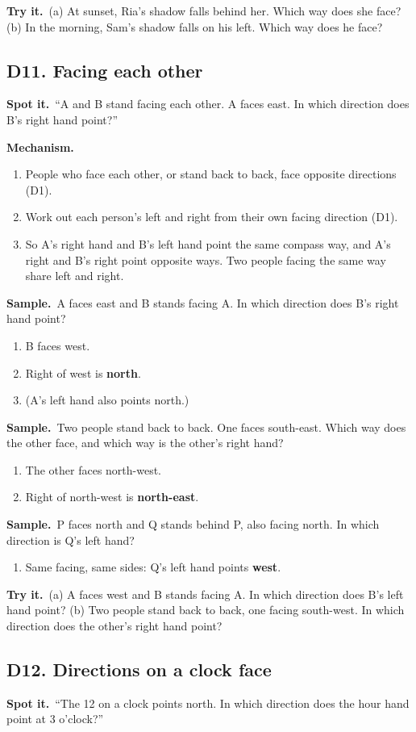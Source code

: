 \documentclass[11pt,a4paper]{article}
\let\oldsubsection\subsection
\renewcommand{\subsection}{\needspace{9\baselineskip}\oldsubsection}
\newcommand{\spot}{\textbf{\color{ember}Spot it.}\ }
\newcommand{\mech}{\textbf{\color{ember}Mechanism.}\ }
\newif\ifkeepsamp
\newcommand{\samp}{\ifkeepsamp\needspace{4\baselineskip}\fi\textbf{\color{ember}Sample.}\ }
\newcommand{\tryit}[1]{\textbf{\color{ember}Try it.}\ #1}
\begin{document}
\tryit (a) At sunset, Ria's shadow falls behind her. Which way does she face? (b) In the morning, Sam's shadow falls on his left. Which way does he face?

\subsection{D11. Facing each other}
\spot ``A and B stand facing each other. A faces east. In which direction does B's right hand point?''

\mech
\begin{enumerate}
\item People who face each other, or stand back to back, face opposite directions (D1).
\item Work out each person's left and right from their own facing direction (D1).
\item So A's right hand and B's left hand point the same compass way, and A's right and B's right point opposite ways. Two people facing the same way share left and right.
\end{enumerate}

\samp A faces east and B stands facing A. In which direction does B's right hand point?
\begin{enumerate}
\item B faces west.
\item Right of west is \textbf{north}.
\item (A's left hand also points north.)
\end{enumerate}
\samp Two people stand back to back. One faces south-east. Which way does the other face, and which way is the other's right hand?
\begin{enumerate}
\item The other faces north-west.
\item Right of north-west is \textbf{north-east}.
\end{enumerate}
\samp P faces north and Q stands behind P, also facing north. In which direction is Q's left hand?
\begin{enumerate}
\item Same facing, same sides: Q's left hand points \textbf{west}.
\end{enumerate}

\tryit (a) A faces west and B stands facing A. In which direction does B's left hand point? (b) Two people stand back to back, one facing south-west. In which direction does the other's right hand point?

\subsection{D12. Directions on a clock face}
\spot ``The 12 on a clock points north. In which direction does the hour hand point at 3 o'clock?''
\end{document}
